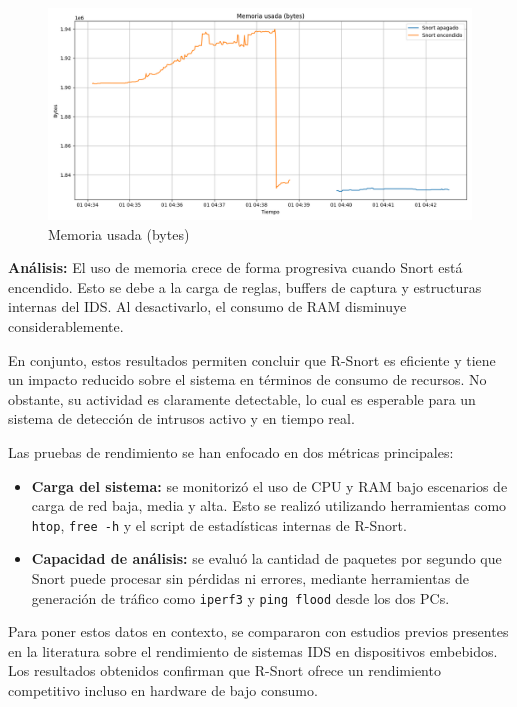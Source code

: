 \documentclass[12pt,a4paper]{report}
\begin{document}
\begin{figure}[H]
	\centering
	\includegraphics[width=\textwidth]{graficas/mem_used.png}
	\caption{Memoria usada (bytes)}
\end{figure}
\textbf{Análisis:} El uso de memoria crece de forma progresiva cuando Snort está encendido. Esto se debe a la carga de reglas, buffers de captura y estructuras internas del IDS. Al desactivarlo, el consumo de RAM disminuye considerablemente.

\pagebreak

En conjunto, estos resultados permiten concluir que R-Snort es eficiente y tiene un impacto reducido sobre el sistema en términos de consumo de recursos. No obstante, su actividad es claramente detectable, lo cual es esperable para un sistema de detección de intrusos activo y en tiempo real.\newline

Las pruebas de rendimiento se han enfocado en dos métricas principales:

\begin{itemize}
	\item \textbf{Carga del sistema:} se monitorizó el uso de CPU y RAM bajo escenarios de carga de red baja, media y alta. Esto se realizó utilizando herramientas como \texttt{htop}, \texttt{free -h} y el script de estadísticas internas de R-Snort.
	\item \textbf{Capacidad de análisis:} se evaluó la cantidad de paquetes por segundo que Snort puede procesar sin pérdidas ni errores, mediante herramientas de generación de tráfico como \texttt{iperf3} y \texttt{ping flood} desde los dos PCs.
\end{itemize}

Para poner estos datos en contexto, se compararon con estudios previos presentes en la literatura sobre el rendimiento de sistemas IDS en dispositivos embebidos. Los resultados obtenidos confirman que R-Snort ofrece un rendimiento competitivo incluso en hardware de bajo consumo.
\end{document}

